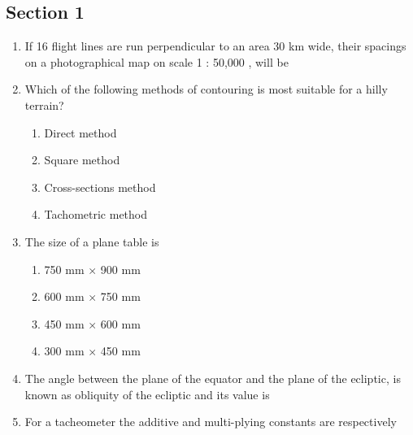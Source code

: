 \documentclass[11pt,a4paper]{article}
\begin{document}
\subsection*{Section 1}
\begin{enumerate}
\item{If 16 flight lines are run perpendicular to an area 30 km wide, their spacings on a photographical map on scale 1 : 50,000 , will be}
\\\begin{enumerate*}[itemjoin=\qquad, label=\Alph*.]
\item{1 cm}
\item{2 cm}
\item{3 cm}
\item{4 cm}
\end{enumerate*}
\item{Which of the following methods of contouring is most suitable for a hilly terrain?}
\begin{enumerate}[label=\Alph*.]
\item{Direct method}
\item{Square method}
\item{Cross-sections method}
\item{Tachometric method}
\end{enumerate}
\item{The size of a plane table is}
\begin{enumerate}[label=\Alph*.]
\item{750 mm $\times$ 900 mm}
\item{600 mm $\times$ 750 mm}
\item{450 mm $\times$ 600 mm}
\item{300 mm $\times$ 450 mm}
\end{enumerate}
\item{The angle between the plane of the equator and the plane of the ecliptic, is known as obliquity of the ecliptic and its value is}
\\
\item{For a tacheometer the additive and multi-plying constants are respectively}
\\\begin{enumerate*}[itemjoin=\qquad, label=\Alph*.]

\end{enumerate*}
\end{enumerate}
\end{document}

